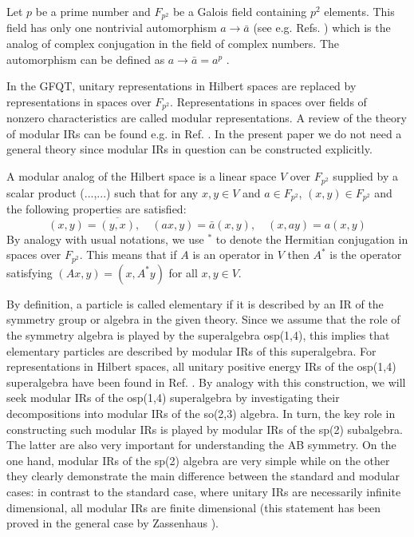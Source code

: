 \documentclass[a4paper,12pt]{article}%
\begin{document}
Let $p$ be a prime number and $F_{p^2}$ be a Galois field
containing $p^2$ elements. This field has only one
nontrivial automorphism $a\rightarrow {\bar a}$ (see e.g.
Refs. \cite{VDW,lev2}) which is the analog of complex
conjugation in the field of complex numbers. The automorphism
can be defined as $a\rightarrow {\bar a}= a^p$ \cite{VDW}. 

In the GFQT, unitary representations in Hilbert spaces are
replaced by representations in spaces over $F_{p^2}$. 
Representations in spaces over fields
of nonzero characteristics are called modular representations.
A review of the theory of modular IRs can be found e.g. in
Ref. \cite{FrPa}. In the present paper we do not need a
general theory since modular IRs in question can be
constructed explicitly.

A modular analog of the Hilbert
space is a linear space $V$ over $F_{p^2}$ supplied by a
scalar product (...,...) such that for any $x,y\in V$
and $a\in F_{p^2}$, $(x,y)\in F_{p^2}$
and the following properties are satisfied: 
\begin{equation}
(x,y) =\overline{(y,x)},\quad (ax,y)=\bar{a}(x,y),\quad 
(x,ay)=a(x,y)
\label{1}
\end{equation}   
By analogy with usual notations, we use $^*$ to denote 
the Hermitian conjugation in spaces over $F_{p^2}$. This means
that if $A$ is an operator in $V$ then $A^*$ is the operator
satisfying $(Ax,y)=(x,A^*y)$ for all $x,y\in V$.

By definition, a particle is called elementary if it is
described by an IR of the symmetry group or algebra in the
given theory. Since we assume that the role of the symmetry
algebra is played by the superalgebra osp(1,4), this implies 
that elementary particles are described by modular IRs of 
this superalgebra. For representations in Hilbert spaces,
all unitary positive energy IRs of the osp(1,4) superalgebra
have been found in Ref.
\cite{Heidenreich}. By analogy with this construction, we
will seek modular IRs of the osp(1,4) superalgebra by
investigating their decompositions into modular IRs of
the so(2,3) algebra.  In turn, the key role in 
constructing such modular IRs is played by modular IRs 
of the sp(2) subalgebra. The latter are also very 
important for understanding the
AB symmetry. On the one hand, modular IRs of the sp(2) 
algebra are very simple while on the other they clearly
demonstrate the main difference between the standard and
modular cases: in contrast to the standard case, where 
unitary IRs are necessarily infinite dimensional, all
modular IRs are finite dimensional (this statement has
been proved in the general case by Zassenhaus \cite{Zass}).
\end{document}
